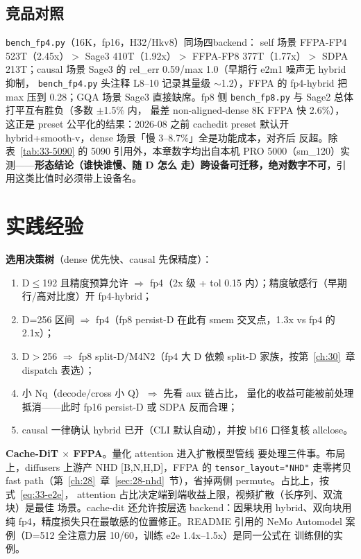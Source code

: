 \subsection{竞品对照}

\texttt{bench\_fp4.py}（16K，fp16，H32/Hkv8）同场四backend：
self 场景 FFPA-FP4 523T（2.45x）$>$ Sage3 410T（1.92x）$>$
FFPA-FP8 377T（1.77x）$>$ SDPA 213T；causal 场景 Sage3 的
rel\_err 0.59/max 1.0（早期行 e2m1 噪声无 hybrid 抑制，
\texttt{bench\_fp4.py} 头注释 L8--10 记录其量级 $\sim$1.2），FFPA
的 fp4-hybrid 把 max 压到 0.28；GQA 场景 Sage3 直接缺席。fp8 侧
\texttt{bench\_fp8.py} 与 Sage2 总体打平互有胜负（多数 $\pm$1.5\% 内，
最差 non-aligned-dense 8K FFPA 快 2.6\%），
这正是 preset 公平化的结果：2026-08 之前 cachedit preset 默认开
hybrid+smooth-v，dense 场景「慢 3--8.7\%」全是功能成本，对齐后
反超。除表~\ref{tab:33-5090} 的 5090 引用外，本章数字均出自本机
PRO 5000（sm\_120）实测——\textbf{形态结论（谁快谁慢、随 D 怎么
走）跨设备可迁移，绝对数字不可}，引用这类比值时必须带上设备名。


\section{实践经验}

\textbf{选用决策树}（dense 优先快、causal 先保精度）：
\begin{enumerate}[itemsep=0pt,topsep=2pt]
  \item D$\le$192 且精度预算允许 $\Rightarrow$ fp4（2x 级 + tol
        0.15 内）；精度敏感行（早期行/高对比度）开 fp4-hybrid；
  \item D=256 区间 $\Rightarrow$ fp4（fp8 persist-D 在此有 smem
        交叉点，1.3x vs fp4 的 2.1x）；
  \item D$>$256 $\Rightarrow$ fp8 split-D/M4N2（fp4 大 D 依赖
        split-D 家族，按第~\ref{ch:30}~章 dispatch 表选）；
  \item 小 Nq（decode/cross 小 Q）$\Rightarrow$ 先看 aux 链占比，
        量化的收益可能被前处理抵消——此时 fp16 persist-D 或 SDPA
        反而合理；
  \item causal 一律确认 hybrid 已开（CLI 默认自动），并按 bf16
        口径复核 allclose。
\end{enumerate}

\textbf{Cache-DiT $\times$ FFPA}。量化 attention 进入扩散模型管线
要处理三件事。布局上，diffusers 上游产 NHD [B,N,H,D]，FFPA 的
\texttt{tensor\_layout="NHD"} 走零拷贝 fast path（第~\ref{ch:28}~章~\ref{sec:28-nhd}~节），省掉两侧 permute。占比上，按式~\ref{eq:33-e2e}，
attention 占比决定端到端收益上限，视频扩散（长序列、双流块）是最佳
场景。cache-dit 还允许按层选 backend：因果块用 hybrid、双向块用纯
fp4，精度损失只在最敏感的位置修正。README 引用的 NeMo Automodel
案例（D=512 全注意力层 10/60，训练 e2e 1.4x--1.5x）是同一公式在
训练侧的实例。

